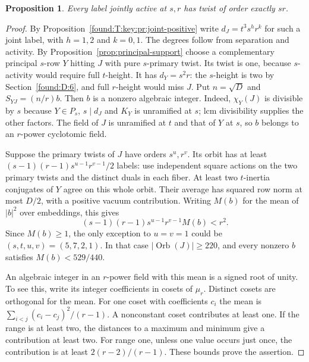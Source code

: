 \documentclass[11pt,a4paper]{article}
\numberwithin{equation}{section}
\newtheorem{proposition}[theorem]{Proposition}
\theoremstyle{remark}
\begin{document}
\begin{proposition}\label{found:T:10.2}\label{found:T:key:pr:joint-exact}
Every label jointly active at $s,r$ has twist of order exactly $sr$.
\end{proposition}

\begin{proof}
By Proposition~\ref{found:T:key:pr:joint-positive} write $d_J=t^3s^h r^k$ for such a joint label, with $h=1,2$ and
$k=0,1$. The degrees follow from separation and activity.
By Proposition~\ref{prop:principal-support} choose a complementary principal $s$-row
$Y$ hitting $J$ with pure $s$-primary twist. Its twist is one,
because $s$-activity would require full $t$-height. It has
$d_Y=s^2r$: the $s$-height is two by
Section~\ref{found:D:6}, and full $r$-height would miss $J$. Put $n=\sqrt D$ and
$S_{YJ}=(n/r)b$. Then $b$ is a nonzero algebraic integer. Indeed,
$\chi_Y(J)$ is divisible by $s$ because $Y\in P_s$, $s\mid d_J$
and $K_Y$ is unramified at $s$; lcm divisibility supplies the other
factors. The field of $J$ is unramified at $t$ and that of $Y$ at
$s$, so $b$ belongs to an $r$-power cyclotomic field.

Suppose the primary twists of $J$ have orders $s^u,r^v$. Its orbit
has at least $(s-1)(r-1)s^{u-1}r^{v-1}/2$ labels: use independent
square actions on the two primary twists and the distinct duals in
each fiber. At least two $t$-inertia conjugates of $Y$ agree on this
whole orbit. Their average has squared row norm at most $D/2$,
with a positive vacuum contribution. Writing $M(b)$ for the mean
of $|b|^2$ over embeddings, this gives
\[
  (s-1)(r-1)s^{u-1}r^{v-1}M(b)<r^2.
\]
Since $M(b)\ge1$, the only exception to $u=v=1$ could be
$(s,t,u,v)=(5,7,2,1)$. In that case $|\operatorname{Orb}(J)|\ge220$,
and every nonzero $b$ satisfies $M(b)<529/440$.

An algebraic integer in an $r$-power field with this mean is a
signed root of unity. To see this, write its integer coefficients
in cosets of $\mu_r$. Distinct cosets are orthogonal for the mean.
For one coset with coefficients $c_i$ the mean is
$\sum_{i<j}(c_i-c_j)^2/(r-1)$. A nonconstant coset contributes at
least one. If the range is at least two, the distances to a maximum
and minimum give a contribution at least two. For range one, unless
one value occurs just once, the contribution is at least
$2(r-2)/(r-1)$. These bounds prove the assertion.


\end{proof}
\end{document}
